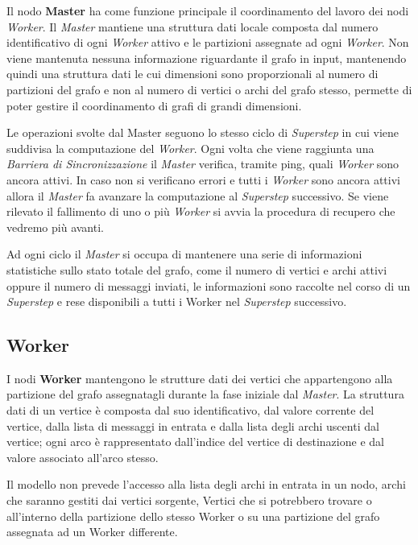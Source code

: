\documentclass[LaM,binding=0.6cm]{sapthesis}
\begin{document}
Il nodo \textbf{Master} ha come funzione principale il coordinamento del lavoro dei nodi \textit{Worker}. Il \textit{Master} mantiene una struttura dati locale composta dal numero identificativo di ogni \textit{Worker} attivo e le partizioni assegnate ad ogni \textit{Worker}. 
Non viene mantenuta nessuna informazione riguardante il grafo in input, mantenendo quindi una struttura dati le cui dimensioni sono proporzionali al numero di partizioni del grafo e non al numero di vertici o archi del grafo stesso, permette di poter gestire il coordinamento di grafi di grandi dimensioni.

Le operazioni svolte dal Master seguono lo stesso ciclo di \textit{Superstep} in cui viene suddivisa la computazione del \textit{Worker}.
Ogni volta che viene raggiunta una \textit{Barriera di Sincronizzazione} il \textit{Master} verifica, tramite ping, quali \textit{Worker} sono ancora attivi. In caso non si verificano errori e tutti i \textit{Worker} sono ancora attivi allora il \textit{Master} fa avanzare la computazione al \textit{Superstep} successivo. Se viene rilevato il fallimento di uno o più \textit{Worker} si avvia la procedura di recupero che vedremo più avanti.

Ad ogni ciclo il \textit{Master} si occupa di mantenere una serie di informazioni statistiche sullo stato totale del grafo, come il numero di vertici e archi attivi oppure il numero di messaggi inviati, le informazioni sono raccolte nel corso di un \textit{Superstep }e rese disponibili a tutti i Worker nel \textit{Superstep} successivo.

\subsection{Worker}
I nodi \textbf{Worker} mantengono le strutture dati dei vertici che appartengono alla partizione del grafo assegnatagli durante la fase iniziale dal \textit{Master}. La struttura dati di un vertice è composta dal suo identificativo, dal valore corrente del vertice, dalla lista di messaggi in entrata e dalla lista degli archi uscenti dal vertice; ogni arco è rappresentato dall'indice del vertice di destinazione e dal valore associato all'arco stesso.

Il modello non prevede l'accesso alla lista degli archi in entrata in un nodo, archi che saranno gestiti dai vertici sorgente, Vertici che si potrebbero trovare o all'interno della partizione dello stesso Worker o su una partizione del grafo assegnata ad un Worker differente.
\end{document}
